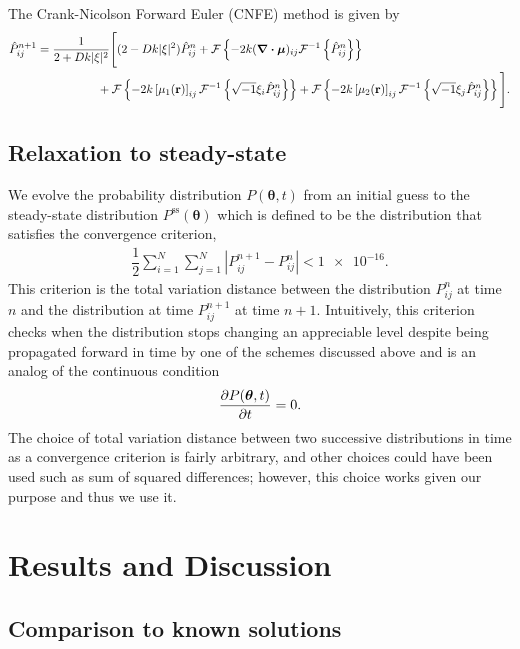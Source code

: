 \documentclass[10pt]{article}
\newcommand{\Phat}{\hat{P}}
\newcommand{\mF}{\mathcal{F}}
\newcommand{\mFi}{\mathcal{F}^{-1}}
\begin{document}
The Crank-Nicolson Forward Euler (CNFE) method is given by
\begin{align}
\Phat_{ij}^{n+1} &= \dfrac{1}{2+Dk|\xi|^{2}}\Bigg[(2-Dk|\xi|^{2})\Phat_{ij}^{n} + \mF\left\{-2k(\div{\bm{\mu}})_{ij}\mFi\left\{\Phat_{ij}^{n}\right\}\right\} \nonumber\\
&\hspace{1.8cm}+ \mF\left\{-2k\left[\mu_{1}(\vb{r})\right]_{ij}\mFi\left\{\sqrt{-1}\xi_{i}\Phat_{ij}^{n}\right\} \right\}+\mF\left\{-2k\left[\mu_{2}(\vb{r})\right]_{ij}\mFi\left\{\sqrt{-1}\xi_{j}\Phat_{ij}^{n}\right\} \right\}\Bigg].\label{eq:cnfe_scheme}
\end{align}

\subsection{Relaxation to steady-state}

We evolve the probability distribution $P(\bm{\theta},t)$ from an initial guess to the steady-state distribution $P^{\mathrm{ss}}(\bm{\theta})$ which is defined to be the distribution that satisfies the convergence criterion,
\begin{align}
    \dfrac{1}{2}\sum\limits_{i=1}^{N}\sum\limits_{j=1}^{N}\left|P_{ij}^{n+1}-P_{ij}^{n}\right| < \num{1e-16}.
\end{align}
This criterion is the total variation distance between the distribution $P_{ij}^{n}$ at time $n$ and the distribution at time $P_{ij}^{n+1}$ at time $n+1$. Intuitively, this criterion checks when the distribution stops changing an appreciable level despite being propagated forward in time by one of the schemes discussed above and is an analog of the continuous condition 
\begin{align}
    \pdv{P(\bm{\theta},t)}{t} = 0.
\end{align}
The choice of total variation distance between two successive distributions in time as a convergence criterion is fairly arbitrary, and other choices could have been used such as sum of squared differences; however, this choice works given our purpose and thus we use it.

\section{Results and Discussion}

\subsection{Comparison to known solutions}
\end{document}
